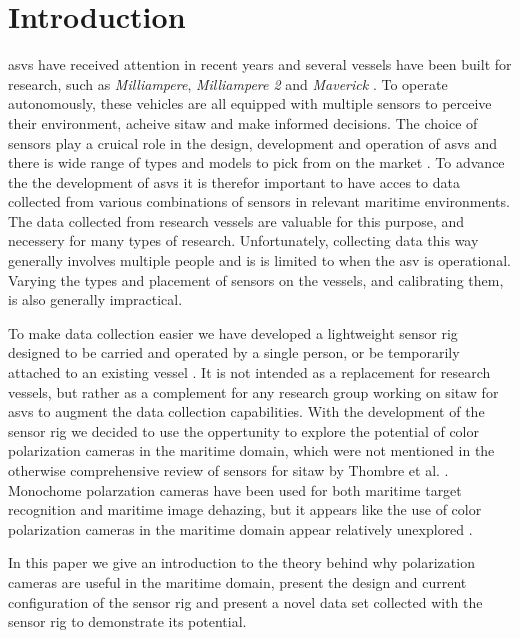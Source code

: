 \section{Introduction}
\glspl{asv} have received attention in recent years and several vessels have been built for research, such as \textit{Milliampere}, \textit{Milliampere 2} and \textit{Maverick} \cite{brekkeMilliAmpereAutonomousFerry2022}\cite{zhangDesignBuildAutonomous2023}\cite{eideAutonomousUrbanPassenger2024}.
To operate autonomously, these vehicles are all equipped with multiple sensors to perceive their environment, acheive \gls{sitaw} and make informed decisions.
The choice of sensors play a cruical role in the design, development and operation of \glspl{asv} and there is wide range of types and models to pick from on the market \cite{thombreSensorsAITechniques2022}.
To advance the the development of \glspl{asv} it is therefor important to have acces to data collected from various combinations  of sensors in relevant maritime environments.
The data collected from research vessels are valuable for this purpose, and necessery for many types of research.
Unfortunately, collecting data this way generally involves multiple people and is is limited to when the \gls{asv} is operational.
Varying the types and placement of sensors on the vessels, and calibrating them, is also generally impractical.

To make data collection easier we have developed a lightweight sensor rig designed to be carried and operated by a single person, or be temporarily attached to an existing vessel \cite{martensPavingWayEnhanced2023}.
It is not intended as a replacement for research vessels, but rather as a complement for any research group working on \gls{sitaw} for \glspl{asv} to augment the data collection capabilities.
With the development of the sensor rig we decided to use the oppertunity to explore the potential of color polarization cameras in the maritime domain, which were not mentioned in the otherwise comprehensive review of sensors for \gls{sitaw} by Thombre et al. \cite{thombreSensorsAITechniques2022}.
Monochome polarzation cameras have been used for both maritime target recognition and maritime image dehazing, but it appears like the use of color polarization cameras in the maritime domain appear relatively unexplored \cite{zhongPolarizationintensityJointImaging2023}\cite{maPolarizationBasedMethodMaritime2024}.

In this paper we give an introduction to the theory behind why polarization cameras are useful in the maritime domain, present the design and current configuration of the sensor rig and present a novel data set collected with the sensor rig to demonstrate its potential.

